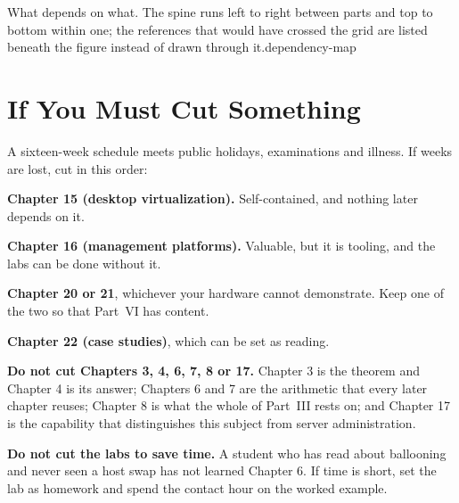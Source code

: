 {}%
{What depends on what. The spine runs left to right between parts and top to
bottom within one; the references that would have crossed the grid are listed
beneath the figure instead of drawn through it.}{dependency-map}

\section{If You Must Cut Something}

\begin{alertbox}
A sixteen-week schedule meets public holidays, examinations and illness. If
weeks are lost, cut in this order:

\begin{tight}
  \item \textbf{Chapter 15 (desktop virtualization).} Self-contained, and
        nothing later depends on it.
  \item \textbf{Chapter 16 (management platforms).} Valuable, but it is
        tooling, and the labs can be done without it.
  \item \textbf{Chapter 20 or 21}, whichever your hardware cannot demonstrate.
        Keep one of the two so that Part~VI has content.
  \item \textbf{Chapter 22 (case studies)}, which can be set as reading.
\end{tight}

\smallskip
\textbf{Do not cut Chapters 3, 4, 6, 7, 8 or 17.} Chapter 3 is the theorem and
Chapter 4 is its answer; Chapters 6 and 7 are the arithmetic that every later
chapter reuses; Chapter 8 is what the whole of Part~III rests on; and
Chapter 17 is the capability that distinguishes this subject from server
administration.

\smallskip
\textbf{Do not cut the labs to save time.} A student who has read about
ballooning and never seen a host swap has not learned Chapter 6. If time is
short, set the lab as homework and spend the contact hour on the worked
example.
\end{alertbox}

